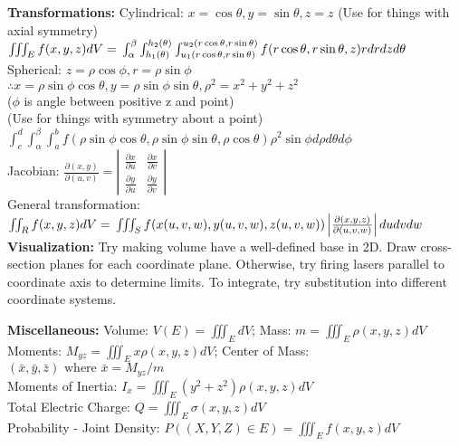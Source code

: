 \documentclass[twoside,draft]{article}
\begin{document}
\begin{multicols}{3}
  \textbf{Transformations:}
  Cylindrical: $x = \cos \theta, y = \sin \theta, z = z$
  (Use for things with axial symmetry) \\
  $\iiint_E f(x,y,z) dV = \\
  \int_{\alpha}^{\beta} \int_{h_1(\theta)}^{h_2(\theta)} \int_{u_1(r \cos \theta, r \sin \theta)}^{u_2(r \cos \theta, r \sin \theta)} f(r \cos \theta, r \sin \theta, z) r dr dz d\theta$ \\
  Spherical: $z = \rho \cos \phi, r = \rho \sin \phi$ \\
  $\therefore x = \rho \sin \phi \cos \theta, y = \rho \sin \phi \sin \theta, \rho^2 = x^2 + y^2 + z^2$ \\
  ($\phi$ is angle between positive z and point) \\
  (Use for things with symmetry about a point) \\
  $\int_c^d \int_{\alpha}^{\beta} \int_a^b f(\rho \sin \phi \cos \theta, \rho \sin \phi \sin \theta, \rho \cos \theta) \rho^2 \sin \phi d\rho d\theta d\phi$ \\
  Jacobian: $\frac{\partial(x,y)}{\partial(u,v)} = \left|
    \begin{matrix}
      \frac{\partial x}{\partial u} & \frac{\partial x}{\partial v} \\
      \frac{\partial y}{\partial u} & \frac{\partial y}{\partial v}
    \end{matrix} \right| $ \\
  General transformation: $\iint_R f(x,y,z) dV = \\
  \iiint_S f(x(u,v,w),y(u,v,w),z(u,v,w)) \left| \frac{\partial(x,y,z)}{\partial(u,v,w)} \right| du dv dw$ \\

  \textbf{Visualization: }
  Try making volume have a well-defined base in 2D. Draw cross-section
  planes for each coordinate plane. Otherwise, try firing
  lasers parallel to coordinate axis to determine limits. To integrate, try
  substitution into different coordinate systems.

  \textbf{Miscellaneous:}
  Volume: $V(E) = \iiint_EdV$;
  Mass: $m = \iiint_E \rho(x,y,z) dV$ \\
  Moments: $M_{yz} = \iiint_E x \rho(x,y,z)dV$;
  Center of Mass: $(\bar{x},\bar{y},\bar{z}) \text{ where } \bar{x} = M_{yz}/m$ \\
  Moments of Inertia: $I_x = \iiint_E (y^2+z^2) \rho(x,y,z) dV$ \\
  Total Electric Charge: $Q = \iiint_E \sigma(x,y,z)dV$ \\
  Probability - Joint Density: $P((X,Y,Z) \in E) = \iiint_E f(x,y,z)dV$ \\


\end{multicols}
\end{document}
